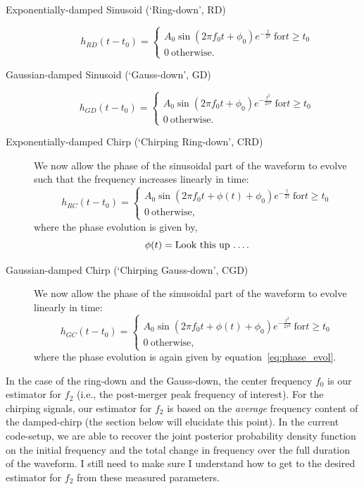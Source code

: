 \documentclass[showpacs, superscriptaddress, showpacs, letterpaper, showkeys,
preprintnumbers, altaffilletter, amssymb, amsmath, amsfonts, prd,
onecolumn, floatfix, nofootinbib]{revtex4-1}
\begin{document}
\begin{description}
\item [Exponentially-damped Sinusoid (`Ring-down', RD)]
\begin{equation}\label{eq:ringdown}
h_{RD}(t-t_0) = 
\begin{cases}
A_0 \sin (2\pi f_0 t + \phi_0) e^{-\frac{t}{2\tau}}~\text{for
$t \geq t_0$} \\
0~\text{otherwise.}
\end{cases}
\end{equation}
\item [Gaussian-damped Sinusoid (`Gauss-down', GD)]
\begin{equation}\label{eq:gaussdown}
h_{GD}(t-t_0) = 
\begin{cases}
A_0 \sin (2\pi f_0 t + \phi_0) e^{-\frac{t^2}{2\tau^2}}~\text{for
$t \geq t_0$} \\
0~\text{otherwise.}
\end{cases}
\end{equation}
\item [Exponentially-damped Chirp (`Chirping Ring-down', CRD)]
We now allow the phase of the sinusoidal part of the waveform to evolve
such that the frequency increases linearly in time:
\begin{equation}\label{eq:ringchirp}
h_{RC}(t-t_0) = 
\begin{cases}
A_0 \sin (2\pi f_0 t + \phi(t) + \phi_0) e^{-\frac{t}{2\tau}}~\text{for
$t \geq t_0$} \\
0~\text{otherwise,}
\end{cases}
\end{equation}
where the phase evolution is given by,
\begin{equation}\label{eq:phase_evol}
\phi(t) = \text{Look this up \dots}.
\end{equation}
\item [Gaussian-damped Chirp (`Chirping Gauss-down', CGD)]
We now allow the phase of the sinusoidal part of the waveform to evolve
linearly in time:
\begin{equation}\label{eq:gausschirp}
h_{GC}(t-t_0) = 
\begin{cases}
A_0 \sin (2\pi f_0 t + \phi(t) + \phi_0) e^{-\frac{t^2}{2\tau^2}}~\text{for
$t \geq t_0$} \\
0~\text{otherwise,}
\end{cases}
\end{equation}
where the phase evolution is again given by equation~\ref{eq:phase_evol}.
\end{description}
%
In the case of the ring-down and the Gauss-down, the center frequency $f_0$ is
our estimator for $f_2$ (i.e., the post-merger peak frequency of interest).  For
the chirping signals, our estimator for $f_2$ is based on the \emph{average}
frequency content of the damped-chirp (the section below will elucidate this
point). In the current code-setup, we are able to recover the joint posterior
probability density function on the initial frequency and the total change in
frequency over the full duration of the waveform.  I still need to make sure I
understand how to get to the desired estimator for $f_2$ from these measured
parameters.
\end{document}

